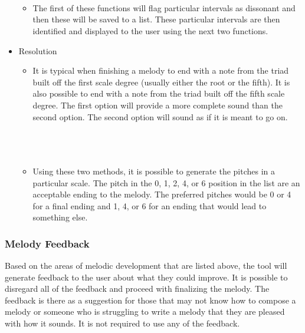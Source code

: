 \begin{itemize}
\begin{itemize}
		 \\
		 \\
		 \\
		\item The first of these functions will flag particular intervals as dissonant and then these will be saved to a list.  These particular intervals are then identified and displayed to the user using the next two functions.
	\end{itemize}
	\item Resolution
	\begin{itemize}
		\item It is typical when finishing a melody to end with a note from the triad built off the first scale degree (usually either the root or the fifth).  It is also possible to end with a note from the triad built off the fifth scale degree.  The first option will provide a more complete sound than the second option.  The second option will sound as if it is meant to go on. \\ \\
		 \\
		 \\
		\item Using these two methods, it is possible to generate the pitches in a particular scale.  The pitch in the 0, 1, 2, 4, or 6 position in the list are an acceptable ending to the melody.  The preferred pitches would be 0 or 4 for a final ending and 1, 4, or 6 for an ending that would lead to something else.
	\end{itemize}
\end{itemize}

\subsubsection{Melody Feedback}
\label{subsubsec:melodyfeedback}

Based on the areas of melodic development that are listed above, the tool will generate feedback to the user about what they could improve.  It is possible to disregard all of the feedback and proceed with finalizing the melody.  The feedback is there as a suggestion for those that may not know how to compose a melody or someone who is struggling to write a melody that they are pleased with how it sounds.  It is not required to use any of the feedback.

